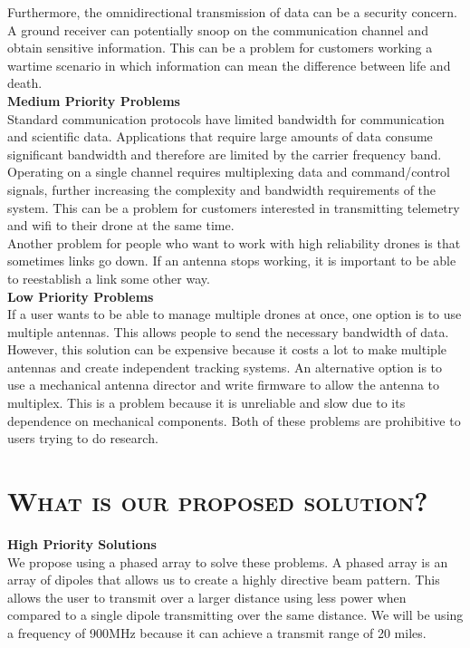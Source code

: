 \documentclass[11pt]{article}
\numberwithin{figure}{section}
\begin{document}
	Furthermore, the omnidirectional transmission of data can be a security concern.  A ground receiver can potentially snoop on the communication channel and obtain sensitive information. This can be a problem for customers working a wartime scenario in which information can mean the difference between life and death.  \\

	\textbf{Medium Priority Problems} \\
	Standard communication protocols have limited bandwidth for communication and scientific data.  Applications that require large amounts of data consume significant bandwidth and therefore are limited by the carrier frequency band.  Operating on a single channel requires multiplexing data and command/control signals, further increasing the complexity and bandwidth requirements of the system. This can be a problem for customers interested in transmitting telemetry and wifi to their drone at the same time. \\
	
	Another problem for people who want to work with high reliability drones is that sometimes links go down. If an antenna stops working, it is important to be able to reestablish a link some other way. \\
	
	\textbf{Low Priority Problems} \\
	If a user wants to be able to manage multiple drones at once, one option is to use multiple antennas. This allows people to send the necessary bandwidth of data. However, this solution can be expensive because it costs a lot to make multiple antennas and create independent tracking systems. An alternative option is to use a mechanical antenna director and write firmware to allow the antenna to multiplex. This is a problem because it is unreliable and slow due to its dependence on mechanical components. Both of these problems are prohibitive to users trying to do research.
	

	
\section{\textsc{What is our proposed solution?}}
	\textbf{High Priority Solutions}  \\
	We propose using a phased array to solve these problems. A phased array is an array of dipoles that allows us to create a highly directive beam pattern. This allows the user to transmit over a larger distance using less power when compared to a single dipole transmitting over the same distance. We will be using a frequency of 900MHz because it can achieve a transmit range of 20 miles.  \\
	
\end{document}
